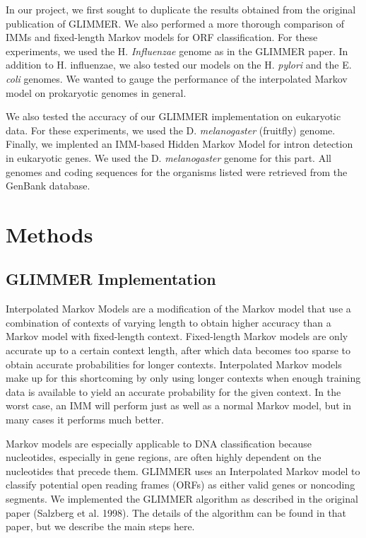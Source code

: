 \documentclass[11pt,letterpaper]{article}
\begin{document}
In our project, we first sought to duplicate the results obtained from the original publication of GLIMMER. We also performed a more thorough comparison of IMMs and fixed-length Markov models for ORF classification. For these experiments, we used the H. \emph{Influenzae} genome as in the GLIMMER paper. In addition to H. influenzae, we also tested our models on the H. \emph{pylori} and the E. \emph{coli} genomes. We wanted to gauge  the performance of the interpolated Markov model on prokaryotic genomes in general.


We also tested the accuracy of our GLIMMER implementation on eukaryotic data. For these experiments, we used the D. \emph{melanogaster} (fruitfly) genome. Finally, we implented an IMM-based Hidden Markov Model for intron detection in eukaryotic genes. We used the D. \emph{melanogaster} genome for this part. All genomes and coding sequences for the organisms listed were retrieved from the GenBank database.

\section{Methods}
\subsection{GLIMMER Implementation}

Interpolated Markov Models are a modification of the Markov model that use a combination of contexts of varying length to obtain higher accuracy than a Markov model with fixed-length context. Fixed-length Markov models are only accurate up to a certain context length, after which data becomes too sparse to obtain accurate probabilities for longer contexts. Interpolated Markov models make up for this shortcoming by only using longer contexts when enough training data is available to yield an accurate probability for the given context. In the worst case, an IMM will perform just as well as a normal Markov model, but in many cases it performs much better. 

Markov models are especially applicable to DNA classification because nucleotides, especially in gene regions, are often highly dependent on the nucleotides that precede them. GLIMMER uses an Interpolated Markov model to classify potential open reading frames (ORFs) as either valid genes or noncoding segments. We implemented the GLIMMER algorithm as described in the original paper (Salzberg et al. 1998). The details of the algorithm can be found in that paper, but we describe the main steps here.
\end{document}
